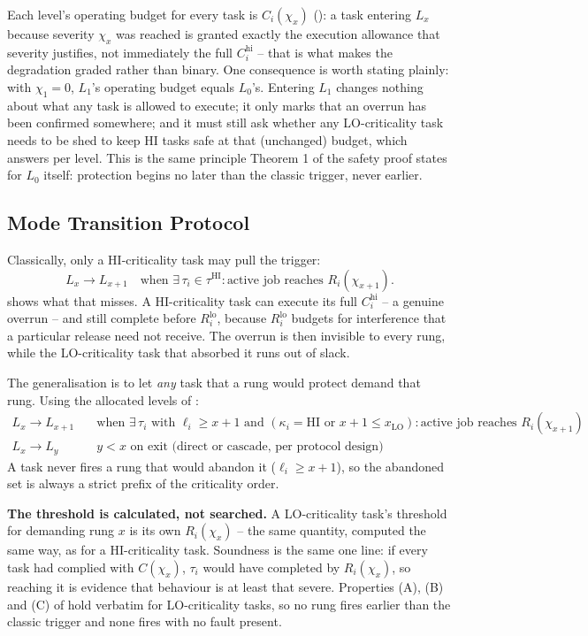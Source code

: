 Each level's operating budget for every task is $C_i(\chi_x)$
(): a task entering $L_x$ because severity $\chi_x$
was reached is granted exactly the execution allowance that severity
justifies, not immediately the full $C_i^{\mathrm{hi}}$ -- that is what makes
the degradation graded rather than binary. One consequence is worth stating
plainly: with $\chi_1 = 0$, $L_1$'s operating budget equals $L_0$'s. Entering
$L_1$ changes nothing about what any task is allowed to execute; it only marks
that an overrun has been confirmed somewhere; and it must still ask whether any
LO-criticality task needs to be shed to keep HI tasks safe at that (unchanged)
budget, which  answers per level. This is the same
principle Theorem 1 of the safety proof states for $L_0$ itself: protection
begins no later than the classic trigger, never earlier.

\subsection{Mode Transition Protocol}
\label{sec:transition}

Classically, only a HI-criticality task may pull the trigger:
\[
L_x \to L_{x+1} \quad \text{when } \exists\, \tau_i \in \tau^{\mathrm{HI}}:
  \text{active job reaches } R_i(\chi_{x+1}).
\]
 shows what that misses. A HI-criticality task can
execute its full $C_i^{\mathrm{hi}}$ -- a genuine overrun -- and still complete
before $R_i^{\mathrm{lo}}$, because $R_i^{\mathrm{lo}}$ budgets for interference
that a particular release need not receive. The overrun is then invisible to
every rung, while the LO-criticality task that absorbed it runs out of slack.

The generalisation is to let \emph{any} task that a rung would protect demand
that rung. Using the allocated levels of :
\begin{align*}
L_x \to L_{x+1} &\quad \text{when } \exists\, \tau_i \text{ with } \ell_i \geq x+1
  \text{ and } (\kappa_i = \mathrm{HI} \text{ or } x+1 \leq x_{\mathrm{LO}}):
  \text{active job reaches } R_i(\chi_{x+1}) \\
L_x \to L_y &\quad y < x \text{ on exit (direct or cascade, per protocol design)}
\end{align*}
A task never fires a rung that would abandon it ($\ell_i \geq x+1$), so the
abandoned set is always a strict prefix of the criticality order.

\textbf{The threshold is calculated, not searched.} A LO-criticality task's
threshold for demanding rung $x$ is its own $R_i(\chi_x)$ -- the same quantity,
computed the same way, as for a HI-criticality task. Soundness is the same one
line: if every task had complied with $C(\chi_x)$, $\tau_i$ would have completed
by $R_i(\chi_x)$, so reaching it is evidence that behaviour is at least that
severe. Properties (A), (B) and (C) of  hold
verbatim for LO-criticality tasks, so no rung fires earlier than the classic
trigger and none fires with no fault present.

